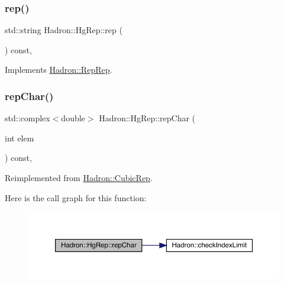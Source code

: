 \mbox{\label{structHadron_1_1HgRep_a229b19e7f1d4fa443b715de9b5ed4454}} 
\subsubsection{\texorpdfstring{rep()}{rep()}\hspace{0.1cm}{\footnotesize\ttfamily [3/3]}}
{\footnotesize\ttfamily std\+::string Hadron\+::\+Hg\+Rep\+::rep (\begin{DoxyParamCaption}{ }\end{DoxyParamCaption}) const\hspace{0.3cm}{\ttfamily [inline]}, {\ttfamily [virtual]}}



Implements \mbox{\hyperlink{structHadron_1_1RepRep_ab3213025f6de249f7095892109575fde}{Hadron\+::\+Rep\+Rep}}.

\mbox{\label{structHadron_1_1HgRep_a49537241226a4b230d73e72cb1a21de3}} 
\subsubsection{\texorpdfstring{repChar()}{repChar()}\hspace{0.1cm}{\footnotesize\ttfamily [1/2]}}
{\footnotesize\ttfamily std\+::complex$<$double$>$ Hadron\+::\+Hg\+Rep\+::rep\+Char (\begin{DoxyParamCaption}\item[{int}]{elem }\end{DoxyParamCaption}) const\hspace{0.3cm}{\ttfamily [inline]}, {\ttfamily [virtual]}}



Reimplemented from \mbox{\hyperlink{structHadron_1_1CubicRep_af45227106e8e715e84b0af69cd3b36f8}{Hadron\+::\+Cubic\+Rep}}.

Here is the call graph for this function\+:
\nopagebreak
\begin{figure}[H]
\begin{center}
\leavevmode
\includegraphics[width=350pt]{d5/d3a/structHadron_1_1HgRep_a49537241226a4b230d73e72cb1a21de3_cgraph}
\end{center}
\end{figure}
\mbox{\label{structHadron_1_1HgRep_a49537241226a4b230d73e72cb1a21de3}} 
